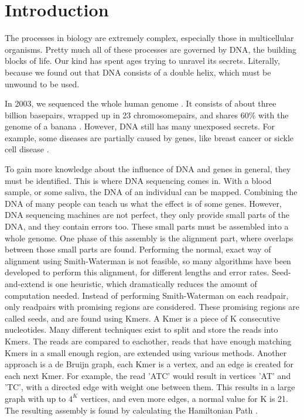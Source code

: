 \documentclass[../main/thesis.tex]{subfiles}
\begin{document}
\chapter{Introduction}
\ifdefined\main
\else

\fi

The processes in biology are extremely complex, especially those in multicellular organisms.
Pretty much all of these processes are governed by DNA, the building blocks of life.
Our kind has spent ages trying to unravel its secrets.
Literally, because we found out that DNA consists of a double helix, which must be unwound to be used.

In 2003, we sequenced the whole human genome {\cite{human_genome_project}}.
It consists of about three billion basepairs, wrapped up in 23 chromosomepairs, and shares 60\% with the genome of a banana \cite{banana}.
However, DNA still has many unexposed secrets.
For example, some diseases are partially caused by genes, like breast cancer or sickle cell disease \cite{genomic_diseases}.

To gain more knowledge about the influence of DNA and genes in general, they must be identified.
This is where DNA sequencing comes in.
With a blood sample, or some saliva, the DNA of an individual can be mapped.
Combining the DNA of many people can teach us what the effect is of some genes.
However, DNA sequencing machines are not perfect, they only provide small parts of the DNA, and they contain errors too.
These small parts must be assembled into a whole genome.
One phase of this assembly is the alignment part, where overlaps between those small parts are found.
Performing the normal, exact way of alignment using Smith-Waterman is not feasible, so many algorithms have been developed to perform this alignment, for different lengths and error rates.
Seed-and-extend is one heuristic, which dramatically reduces the amount of computation needed.
Instead of performing Smith-Waterman on each readpair, only readpairs with promising regions are considered.
These promising regions are called seeds, and are found using Kmers.
A Kmer is a piece of K consecutive nucleotides.
Many different techniques exist to split and store the reads into Kmers.
The reads are compared to eachother, reads that have enough matching Kmers in a small enough region, are extended using various methods.
Another approach is a de Bruijn graph, each Kmer is a vertex, and an edge is created for each next Kmer.
For example, the read 'ATC' would result in vertices 'AT' and 'TC', with a directed edge with weight one between them.
This results in a large graph with up to $4^K$ vertices, and even more edges, a normal value for K is 21.
The resulting assembly is found by calculating the Hamiltonian Path \cite{Euler_Hamil_paths}.
\end{document}

